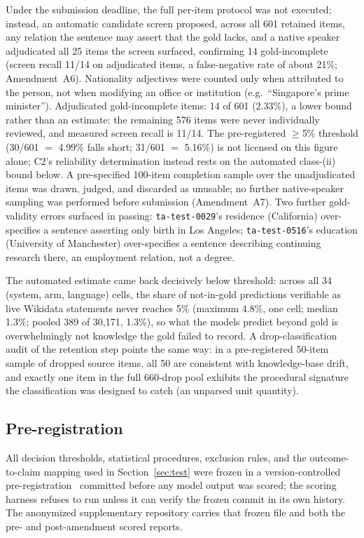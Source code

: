 \documentclass{llncs}
\begin{document}
Under the submission deadline, the full per-item protocol was not executed;
instead, an automatic candidate screen proposed, across all 601 retained
items, any relation the sentence may assert that the gold lacks, and a
native speaker adjudicated all 25 items the screen surfaced, confirming 14
gold-incomplete (screen recall 11/14 on adjudicated
items, a false-negative rate of about 21\%; Amendment~A6). Nationality
adjectives were counted only when attributed to the person, not when
modifying an office or institution (e.g.\ ``Singapore's prime minister'').
Adjudicated gold-incomplete items: 14 of 601 (2.33\%), a lower bound rather
than an estimate: the remaining 576 items were never individually reviewed,
and measured screen recall is 11/14. The pre-registered $\geq$5\% threshold
(30/601 $=$ 4.99\% falls short; 31/601 $=$ 5.16\%) is not licensed on this
figure alone; C2's reliability determination instead rests on the automated
class-(ii) bound below. A pre-specified 100-item completion sample over the
unadjudicated items was drawn, judged, and discarded as unusable; no
further native-speaker sampling was performed before submission
(Amendment~A7). Two further gold-validity errors surfaced in
passing: \texttt{ta-test-0029}'s residence (California) over-specifies a
sentence asserting only birth in Los Angeles; \texttt{ta-test-0516}'s
education (University of Manchester) over-specifies a sentence describing
continuing research there, an employment relation, not a degree.

The automated estimate came back decisively below threshold: across all 34
(system, arm, language) cells, the share of not-in-gold predictions
verifiable as live Wikidata statements never reaches 5\% (maximum 4.8\%, one
cell; median 1.3\%; pooled 389 of 30{,}171, 1.3\%), so what the models
predict beyond gold is overwhelmingly not knowledge the gold failed to
record. A
drop-classification audit of the retention step points the same way: in a
pre-registered 50-item sample of dropped source items, all 50 are consistent
with knowledge-base drift, and exactly one item in the full 660-drop pool
exhibits the procedural signature the classification was designed to catch
(an unparsed unit quantity).

\subsection{Pre-registration}
All decision thresholds, statistical procedures, exclusion rules, and the
outcome-to-claim mapping used in Section~\ref{sec:test} were frozen in a
version-controlled pre-registration~\cite{vanmiltenburg2021preregistering}
committed before any model output was scored; the scoring harness refuses to
run unless it can verify the frozen commit in its own history. The
anonymized supplementary repository carries that frozen file and both the
pre- and post-amendment scored reports.
\end{document}
